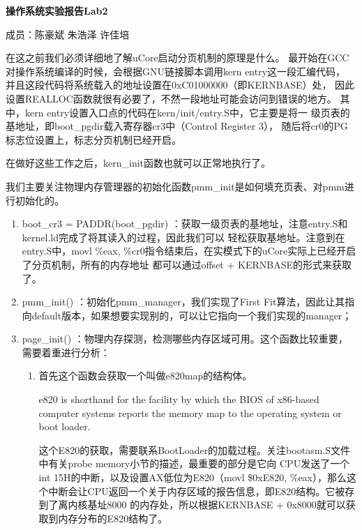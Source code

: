 \documentclass[UTF8, a4paper]{ctexart}
\begin{document}
\centerline{\textbf{\LARGE{操作系统实验报告Lab2}}}
\bigskip
\centerline{\large{成员：陈豪斌 \quad 朱浩泽 \quad 许佳培}}
\bigskip
    在这之前我们必须详细地了解uCore启动分页机制的原理是什么。
    最开始在GCC对操作系统编译的时候，会根据GNU链接脚本调用kern entry这一段汇编代码，
    并且这段代码将系统载入的地址设置在0xC01000000（即KERNBASE）处，
    因此设置REALLOC函数就很有必要了，不然一段地址可能会访问到错误的地方。
    其中，kern entry设置入口点的代码在kern/init/entry.S中，它主要是将一
    级页表的基地址，即boot\_pgdir载入寄存器cr3中（Control Register 3），
    随后将cr0的PG标志位设置上，标志分页机制已经开启。
    \par 
    在做好这些工作之后，kern\_init函数也就可以正常地执行了。
    \bigskip
    \par 
    我们主要关注物理内存管理器的初始化函数pmm\_init是如何填充页表、对pmm进行初始化的。
    \begin{enumerate}
        \item boot\_cr3 = PADDR(boot\_pgdir) ：获取一级页表的基地址，注意entry.S和kernel.ld完成了将其读入的过程，因此我们可以
              轻松获取基地址。注意到在entry.S中，movl \%eax, \%cr0指令结束后，在实模式下的uCore实际上已经开启了分页机制，所有的内存地址
              都可以通过offset + KERNBASE的形式来获取了。
        \item pmm\_init() ：初始化pmm\_manager，我们实现了First Fit算法，因此让其指向default版本，如果想要实现别的，可以让它指向一个我们实现的manager；
        \item page\_init() ：物理内存探测，检测哪些内存区域可用。这个函数比较重要，需要着重进行分析：
            {
                \begin{enumerate}
                    \item 首先这个函数会获取一个叫做e820map的结构体。
                            \par
                            e820 is shorthand for the facility by which the BIOS of x86-based computer systems reports the memory map to the operating system or boot loader.
                            \par
                            这个E820的获取，需要联系BootLoader的加载过程。关注bootasm.S文件中有关probe memory小节的描述，最重要的部分是它向
                            CPU发送了一个int 15H的中断，以及设置AX低位为E820（movl \$0xE820, \%eax），那么这个中断会让CPU返回一个关于内存区域的报告信息，即E820结构。它被存到了离内核基址8000
                            的内存处，所以根据KERNBASE + 0x8000就可以获取到内存分布的E820结构了。
                \end{enumerate}
            }
    \end{enumerate} 
\end{document}
